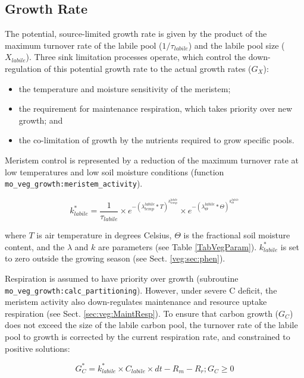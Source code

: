 \subsection{Growth Rate}\label{sec:GrowthRate}

The potential, source-limited growth rate is given by the product of the maximum turnover rate of the labile pool ($1/\tau_{labile}$) and the labile pool size ($X_{labile}$). Three sink limitation processes operate, which control the down-regulation of this potential growth rate to the actual growth rates ($G_X$): 

\begin{itemize}
\item the temperature and moisture sensitivity of the meristem; 
\item the requirement for maintenance respiration, which takes priority over new growth; and 
\item the co-limitation of growth by the nutrients required to grow specific pools. 
\end{itemize}

Meristem control is represented by a reduction of the maximum turnover rate at low temperatures and low soil moisture conditions (function \texttt{mo\_veg\_growth:meristem\_activity}).

\begin{equation}
k^{*}_{labile} = \frac{1}{\tau_{labile}} \times e^{-(\lambda^{labile}_{temp}*T)^{k^{labile}_{temp}}} \times e^{-(\lambda^{labile}_{\Theta}*\Theta)^{k^{labile}_{\Theta}}}\label{eq:veg:k0_lab}
\end{equation}

where $T$ is air temperature in degrees Celsius, $\Theta$ is the fractional soil moisture content, and the $\lambda$ and $k$ are parameters (see Table \ref{TabVegParam}). $k^{*}_{labile}$ is set to zero outside the growing season (see Sect. \ref{veg:sec:phen}).

Respiration is assumed to have priority over growth (subroutine \texttt{mo\_veg\_growth:calc\_partitioning}). However, under severe C deficit, the meristem activity also down-regulates maintenance and resource uptake respiration (see Sect. \ref{sec:veg:MaintResp}). To ensure that carbon growth ($G_C$) does not exceed the size of the labile carbon pool, the turnover rate of the labile pool to growth is corrected by the current respiration rate, and constrained to positive solutions:

\begin{equation}\label{eq:growth_c}
G^{*}_C = k^{*}_{labile} \times C_{labile} \times dt - R_m - R_r; G_C \ge 0
\end{equation}

